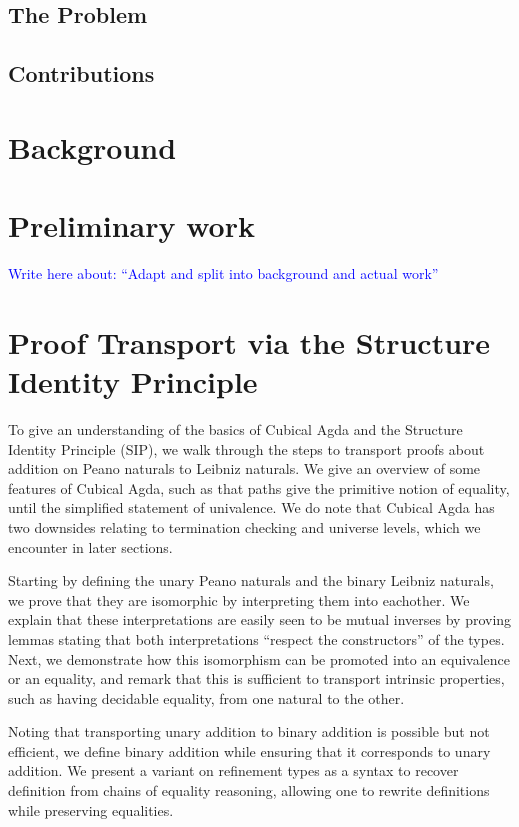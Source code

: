 \documentclass{article}
\theoremstyle{plain}%
\theoremstyle{definition}
\newcommand{\towrite}[1]{\par\textcolor{blue}{Write here about: ``#1''}\par}
\begin{document}
\subsection{The Problem}

\subsection{Contributions}


\section{Background}


\section{Preliminary work}\label{sec:preliminary}
\towrite{Adapt and split into background and actual work}

\section{Proof Transport via the Structure Identity Principle}\label{sec:leibniz}
To give an understanding of the basics of Cubical Agda \cite{cuagda} and the Structure Identity Principle (SIP), we walk through the steps to transport proofs about addition on Peano naturals to Leibniz naturals. We give an overview of some features of Cubical Agda, such as that paths give the primitive notion of equality, until the simplified statement of univalence. We do note that Cubical Agda has two downsides relating to termination checking and universe levels, which we encounter in later sections.

Starting by defining the unary Peano naturals and the binary Leibniz naturals, we prove that they are isomorphic by interpreting them into eachother. We explain that these interpretations are easily seen to be mutual inverses by proving lemmas stating that both interpretations ``respect the constructors'' of the types. Next, we demonstrate how this isomorphism can be promoted into an equivalence or an equality, and remark that this is sufficient to transport intrinsic properties, such as having decidable equality, from one natural to the other.

Noting that transporting unary addition to binary addition is possible but not efficient, we define binary addition while ensuring that it corresponds to unary addition. We present a variant on refinement types as a syntax to recover definition from chains of equality reasoning, allowing one to rewrite definitions while preserving equalities.
\end{document}
